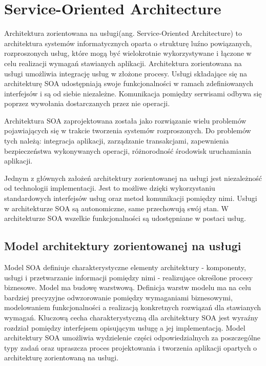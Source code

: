 
\section{Service-Oriented Architecture}
\label{sec:soa}

	Architektura zorientowana na usługi(ang. Service-Oriented Architecture) to architektura systemów informatycznych oparta o strukturę luźno powiązanych, rozproszonych usług, które mogą być wielokrotnie wykorzystywane i łączone w celu realizacji wymagań stawianych aplikacji. Architektura zorientowana na usługi umożliwia integrację usług w złożone procesy\cite{Lawler08}. Usługi składające się na architekturę SOA udostępniają swoje  funkcjonalności w ramach zdefiniowanych interfejsów i są od siebie niezależne. Komunikacja pomiędzy serwisami odbywa się poprzez wywołania dostarczanych przez nie operacji\cite{Papazoglou07}. 

	Architektura SOA zaprojektowana została jako rozwiązanie wielu problemów pojawiających się w trakcie tworzenia systemów rozproszonych. Do problemów tych należą: integracja aplikacji, zarządzanie transakcjami, zapewnienia bezpieczeństwa wykonywanych operacji, różnorodność środowisk uruchamiania aplikacji\cite{Papazoglou07}.

	Jednym z głównych założeń architektury zorientowanej na usługi jest niezależność od technologii implementacji. Jest to możliwe dzięki wykorzystaniu standardowych interfejsów usług oraz metod komunikacji pomiędzy nimi. Usługi w architekturze SOA są autonomiczne, same przechowują swój stan. W architekturze SOA wszelkie funkcjonalności są udostępniane w postaci usług.
	
	\subsection{Model architektury zorientowanej na usługi}
	
		Model SOA definiuje charakterystyczne elementy architektury - komponenty, usługi i przetwarzanie informacji pomiędzy nimi - realizujące określone procesy biznesowe. Model ma budowę warstwową. Definicja warstw modelu ma na celu bardziej precyzyjne odwzorowanie pomiędzy wymaganiami biznesowymi, modelowaniem funkcjonalności a realizacją konkretnych rozwiązań dla stawianych wymagań. Kluczową cecha charakterystyczną dla architektury SOA jest wyraźny rozdział pomiędzy interfejsem opisującym usługę a jej implementacją. Model architektury SOA umożliwia wydzielenie części odpowiedzialnych za poszczególne typy zadań oraz upraszcza proces projektowania i tworzenia aplikacji opartych o architekturę zorientowaną na usługi\cite{Arsanjani07}. 

